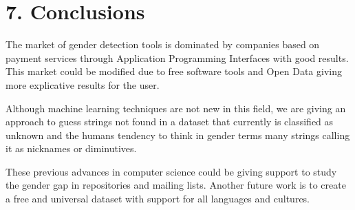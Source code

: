 \documentclass[fleqn,10pt,lineno]{wlpeerj} %
\begin{document}
\section*{7. Conclusions}

The market of gender detection tools is dominated by companies based
on payment services through Application Programming Interfaces with
good results. This market could be modified due to free software
tools and Open Data giving more explicative results for the user.

Although machine learning techniques are not new in this field, we
are giving an approach to guess strings not found in a dataset that
currently is classified as unknown and the humans tendency to think in
gender terms many strings calling it as nicknames or diminutives.

These previous advances in computer science could be giving support to
study the gender gap in repositories and mailing lists. Another future
work is to create a free and universal dataset with support for all
languages and cultures.


\end{document}
